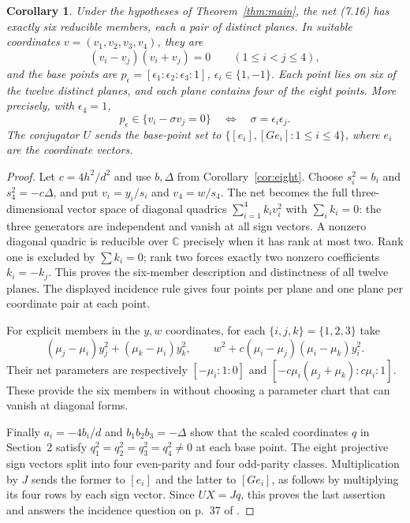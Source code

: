 \documentclass[11pt]{article}
\newtheorem{corollary}[theorem]{Corollary}
\newcommand{\C}{\mathbb C}
\begin{document}
\begin{corollary}\label{cor:incidence}
Under the hypotheses of Theorem~\ref{thm:main}, the net (7.16) has exactly
six reducible members, each a pair of distinct planes. In suitable coordinates
$v=(v_1,v_2,v_3,v_4)$, they are
\[
 (v_i-v_j)(v_i+v_j)=0\qquad(1\le i<j\le4),
\]
and the base points are
$p_{\epsilon}=[\epsilon_1:\epsilon_2:\epsilon_3:1]$,
$\epsilon_i\in\{1,-1\}$.
Each point lies on six of the twelve distinct planes, and each plane contains
four of the eight points. More precisely, with $\epsilon_4=1$,
\[
 p_{\epsilon}\in\{v_i-\sigma v_j=0\}
 \quad\Longleftrightarrow\quad \sigma=\epsilon_i\epsilon_j.
\]
The conjugator $U$ sends the base-point set to
$\{[e_i],[Ge_i]:1\le i\le4\}$, where $e_i$ are the coordinate vectors.
\end{corollary}
\begin{proof}
Let $c=4h^2/d^2$ and use $b,\Delta$ from Corollary~\ref{cor:eight}.
Choose $s_i^2=b_i$ and $s_4^2=-c\Delta$, and put
$v_i=y_i/s_i$ and $v_4=w/s_4$. The net becomes the full
three-dimensional vector space of diagonal quadrics
$\sum_{i=1}^4 k_i v_i^2$ with $\sum_i k_i=0$:
the three generators are independent and vanish at all sign vectors.
A nonzero diagonal quadric is reducible over $\C$ precisely when it has
rank at most two. Rank one is excluded by $\sum k_i=0$; rank two forces
exactly two nonzero coefficients $k_i=-k_j$. This proves the six-member
description and distinctness of all twelve planes. The displayed incidence
rule gives four points per plane and one plane per coordinate pair at each point.

For explicit members in the $y,w$ coordinates, for each
$\{i,j,k\}=\{1,2,3\}$ take
\[
 (\mu_j-\mu_i)y_j^2+(\mu_k-\mu_i)y_k^2,
 \qquad w^2+c(\mu_i-\mu_j)(\mu_i-\mu_k)y_i^2.
\]
Their net parameters are respectively
$[-\mu_i:1:0]$ and $[-c\mu_i(\mu_j+\mu_k):c\mu_i:1]$.
These provide the six members in \cite[(7.20)--(7.23)]{GG}
without choosing a parameter chart that can vanish at diagonal forms.

Finally $a_i=-4b_i/d$ and $b_1b_2b_3=-\Delta$ show that the
scaled coordinates $q$ in Section~2 satisfy
$q_1^2=q_2^2=q_3^2=q_4^2\ne0$ at each base point.
The eight projective sign vectors split into four even-parity and four
odd-parity classes. Multiplication by $J$ sends the former to $[e_i]$
and the latter to $[Ge_i]$, as follows by multiplying its four rows
by each sign vector. Since $UX=Jq$, this proves the last assertion and
answers the incidence question on p.\ 37 of \cite{GG}.
\end{proof}
\end{document}
